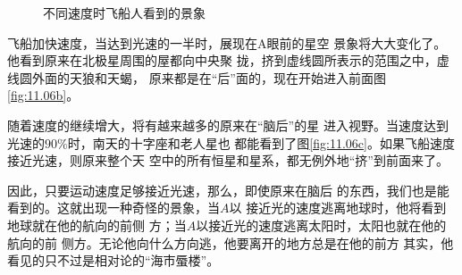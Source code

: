 \begin{figure}[h]
  \centering
  \caption{不同速度时飞船人看到的景象}
  \label{fig:11.06}
\end{figure}

飞船加快速度，当达到光速的一半时，展现在A眼前的星空
景象将大大变化了。他看到原来在北极星周围的屋都向中央聚
拢，挤到虚线圆所表示的范围之中，虚线圆外面的天狼和天蝎，
原来都是在“后”面的，现在开始进入前面\lhbrak 图\ref{fig:11.06b}\rhbrak 。

随着速度的继续增大，将有越来越多的原来在“脑后”的星
进入视野。当速度达到光速的$ 90\% $时，南天的十字座和老人星也
都能看到了\lhbrak 图\ref{fig:11.06c}\rhbrak 。如果飞船速度接近光速，则原来整个天
空中的所有恒星和星系，都无例外地“挤”到前面来了。

因此，只要运动速度足够接近光速，那么，即使原来在脑后
的东西，我们也是能看到的。这就出现一种奇怪的景象，当$ A $以
接近光的速度逃离地球时，他将看到地球就在他的航向的前侧
方；当$ A $以接近光的速度逃离太阳时，太阳也就在他的航向的前
侧方。无论他向什么方向逃，他要离开的地方总是在他的前方
其实，他看见的只不过是相对论的“海市蜃楼”。
